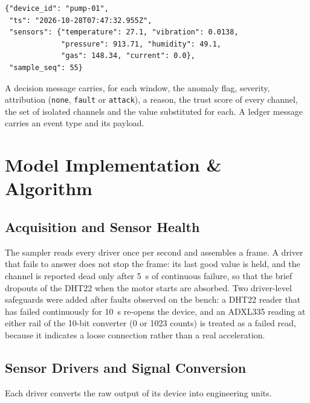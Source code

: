 \begin{lstlisting}[float=htbp, caption={A telemetry frame recorded on the bench rig}, label={lst:frame}]
{"device_id": "pump-01",
 "ts": "2026-10-28T07:47:32.955Z",
 "sensors": {"temperature": 27.1, "vibration": 0.0138,
             "pressure": 913.71, "humidity": 49.1,
             "gas": 148.34, "current": 0.0},
 "sample_seq": 55}
\end{lstlisting}

A decision message carries, for each window, the anomaly flag, severity, attribution (\texttt{none}, \texttt{fault} or \texttt{attack}), a reason, the trust score of every channel, the set of isolated channels and the value substituted for each. A ledger message carries an event type and its payload.

\section{Model Implementation \& Algorithm}

\subsection{Acquisition and Sensor Health}

The sampler reads every driver once per second and assembles a frame. A driver that fails to answer does not stop the frame: its last good value is held, and the channel is reported dead only after 5~s of continuous failure, so that the brief dropouts of the DHT22 when the motor starts are absorbed. Two driver-level safeguards were added after faults observed on the bench: a DHT22 reader that has failed continuously for 10~s re-opens the device, and an ADXL335 reading at either rail of the 10-bit converter (0 or 1023 counts) is treated as a failed read, because it indicates a loose connection rather than a real acceleration.

\subsection{Sensor Drivers and Signal Conversion}

Each driver converts the raw output of its device into engineering units.

